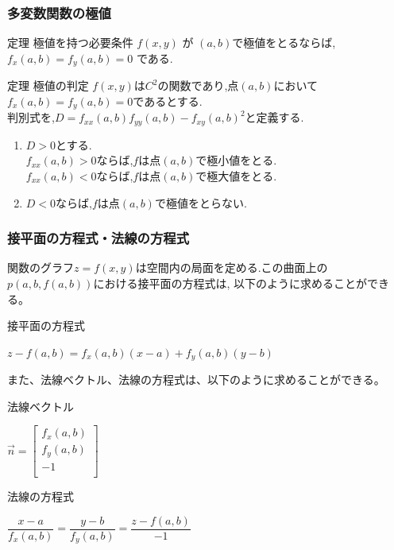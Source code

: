 \documentclass[a4paper]{jsarticle}
\begin{document}
\subsubsection{多変数関数の極値}
\begin{itembox}[l]{定理 極値を持つ必要条件}
    $f\left(x,y\right)$ が $\left(a,b\right)$で極値をとるならば,
    $f_x\left(a,b\right)=f_y\left(a,b\right)=0$ である.
\end{itembox}
\begin{itembox}[l]{定理 極値の判定}
    $f\left(x,y\right)$は$C^2$の関数であり,点$\left(a,b\right)$において
    $f_x\left(a,b\right)=f_y\left(a, b\right)=0$であるとする.\\
    判別式を,$D=f_{xx}\left(a,b\right)f_{yy}\left(a,b\right)-{f_{xy}(a,b)}^2$と定義する.
    \begin{enumerate}[(1)]
        \item $D>0$とする.\\
              $f_{xx}\left(a,b\right)>0$ならば,$f$は点$\left(a,b\right)$で極小値をとる.\\
              $f_{xx}\left(a,b\right)<0$ならば,$f$は点$\left(a,b\right)$で極大値をとる.
        \item $D<0$ならば,$f$は点$\left(a,b\right)$で極値をとらない.
    \end{enumerate}
\end{itembox}
\subsubsection{接平面の方程式・法線の方程式}
関数のグラフ$z=f\left(x,y\right)$は空間内の局面を定める.この曲面上の$p(a,b,f\left(a,b\right))$における接平面の方程式は,
以下のように求めることができる。
\begin{itembox}[l]{接平面の方程式}
    \begin{center}
        $z-f\left(a,b\right)=f_x\left(a,b\right)\left(x-a\right)+f_y\left(a,b\right)\left(y-b\right)$
    \end{center}
\end{itembox}
また、法線ベクトル、法線の方程式は、以下のように求めることができる。
\begin{itembox}[l]{法線ベクトル}
    \begin{center}
        $ \vec{n}=
            \begin{bmatrix}
                f_x\left(a,b\right) \\
                f_y\left(a,b\right) \\
                -1                  \\
            \end{bmatrix}
        $
    \end{center}
\end{itembox}
\begin{itembox}[l]{法線の方程式}
    \begin{center}
        $\dfrac{x-a}{f_x\left(a,b\right)}=\dfrac{y-b}{f_y\left(a,b\right)}=\dfrac{z-f\left(a,b\right)}{-1}$
    \end{center}
\end{itembox}
\end{document}
